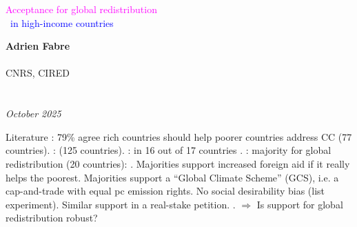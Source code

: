 \documentclass[aspectratio=169,xcolor=dvipsnames, 11pt,mathserif]{beamer}
\begin{document}

\begin{frame}
\thispagestyle{empty}
\begin{center}
\begin{LARGE}
\textcolor{magenta}{Acceptance for global redistribution}\\~\textcolor{blue}{in high-income countries} \end{LARGE}
\vspace{1cm}

\textbf{Adrien Fabre} \\ \quad \\
CNRS, CIRED \\ \quad \\ \quad \\
\textit{October 2025} 
\end{center}
\bigskip
\end{frame}


\begin{frame}{Literature\label{literature}}
\bbvsp
\ip {}: 79\% agree rich countries should help poorer countries address CC (77 countries).
\ip {}:  (125 countries).
\ip {}:  in 16 out of 17 countries .
\ip {}:  majority  for global redistribution (20 countries):
\bbvsp \ip {}.
\ip Majorities support increased foreign aid if it really helps the poorest.
\ip Majorities support a ``Global Climate Scheme'' (GCS), i.e. a cap-and-trade with equal pc emission rights.
\ip No social desirability bias (list experiment). Similar support in a real-stake petition.
\ip {}.
\ee 
\ip $\Rightarrow$ Is support for global redistribution robust?
\ee
\end{frame}
\end{document}
